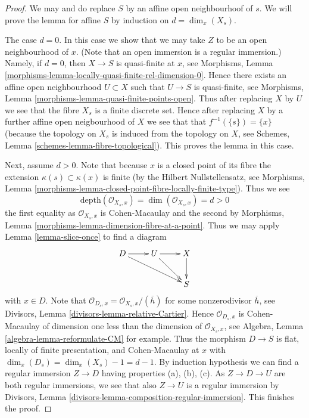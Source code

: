 \begin{proof}
We may and do replace $S$ by an affine open neighbourhoof of $s$.
We will prove the lemma for affine $S$ by induction on $d = \dim_x(X_s)$.

\medskip\noindent
The case $d = 0$. In this case we show that we may take $Z$ to be
an open neighbourhood of $x$. (Note that an open immersion is
a regular immersion.) Namely, if $d = 0$, then $X \to S$
is quasi-finite at $x$, see
Morphisms, Lemma \ref{morphisms-lemma-locally-quasi-finite-rel-dimension-0}.
Hence there exists an affine open neighbourhood $U \subset X$ such
that $U \to S$ is quasi-finite, see
Morphisms, Lemma \ref{morphisms-lemma-quasi-finite-points-open}.
Thus after replacing $X$ by $U$ we see that the fibre $X_s$ is a finite
discrete set. Hence after replacing $X$ by a further affine open neigbourhood
of $X$ we see that that $f^{-1}(\{s\}) = \{x\}$ (because the topology
on $X_s$ is induced from the topology on $X$, see
Schemes, Lemma \ref{schemes-lemma-fibre-topological}).
This proves the lemma in this case.

\medskip\noindent
Next, assume $d > 0$. Note that because $x$ is a closed point of its
fibre the extension $\kappa(s) \subset \kappa(x)$ is finite (by the
Hilbert Nullstellensatz, see
Morphisms, Lemma \ref{morphisms-lemma-closed-point-fibre-locally-finite-type}).
Thus we see
$$
\text{depth}(\mathcal{O}_{X_s, x}) = \dim(\mathcal{O}_{X_s, x}) = d > 0
$$
the first equality as $\mathcal{O}_{X_s, x}$ is Cohen-Macaulay and
the second by
Morphisms, Lemma \ref{morphisms-lemma-dimension-fibre-at-a-point}.
Thus we may apply
Lemma \ref{lemma-slice-once}
to find a diagram
$$
\xymatrix{
D \ar[r] \ar[rrd] & U \ar[r] \ar[rd] & X \ar[d] \\
& & S
}
$$
with $x \in D$. Note that
$\mathcal{O}_{D_s, x} = \mathcal{O}_{X_s, x}/(\overline{h})$ for some
nonzerodivisor $\overline{h}$, see
Divisors, Lemma \ref{divisors-lemma-relative-Cartier}.
Hence $\mathcal{O}_{D_s, x}$ is Cohen-Macaulay of dimension
one less than the dimension of $\mathcal{O}_{X_s, x}$, see
Algebra, Lemma \ref{algebra-lemma-reformulate-CM}
for example. Thus the morphism $D \to S$ is flat,
locally of finite presentation, and Cohen-Macaulay at $x$ with
$\dim_x(D_s) = \dim_x(X_s) - 1 = d - 1$. By induction hypothesis
we can find a regular immersion $Z \to D$ having properties (a), (b), (c).
As $Z \to D \to U$ are both regular immersions, we see that also
$Z \to U$ is a regular immersion by
Divisors, Lemma \ref{divisors-lemma-composition-regular-immersion}.
This finishes the proof.
\end{proof}

